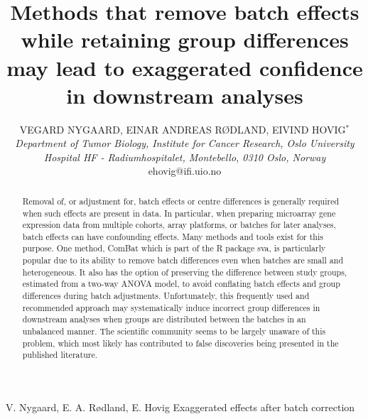 \documentclass{bio}
\begin{document}
\title{Methods that remove batch effects while retaining group differences may lead
to exaggerated confidence in downstream analyses
}

\author{VEGARD NYGAARD, EINAR ANDREAS RØDLAND, EIVIND HOVIG$^\ast$\\[4pt]
\textit{Department of Tumor Biology,
Institute for Cancer Research,
Oslo University Hospital HF - Radiumhospitalet,
Montebello,
0310 Oslo,
Norway}
\\[2pt]
{ehovig@ifi.uio.no}}


\markboth%
{V. Nygaard, E. A. Rødland, E. Hovig}
{Exaggerated effects after batch correction}


\maketitle



\begin{abstract}
{Removal of, or adjustment for, batch effects or centre differences is generally required when such effects are present in data. In particular, when preparing microarray gene expression data from multiple cohorts, array platforms, or batches for later analyses, batch effects can have confounding effects. Many methods and tools exist for this purpose. One method, ComBat which is part of the R package sva, is particularly popular due to its ability to remove batch differences even when batches are small and heterogeneous. It also has the option of preserving the difference between study groups, estimated from a two-way ANOVA model, to avoid conflating batch effects and group differences during batch adjustments. Unfortunately, this frequently used and recommended approach may systematically induce incorrect group differences in downstream analyses when groups are distributed between the batches in an unbalanced manner. The scientific community seems to be largely unaware of this problem, which most likely has contributed to false discoveries being presented in the published literature.
}
\end{abstract}
\end{document}
